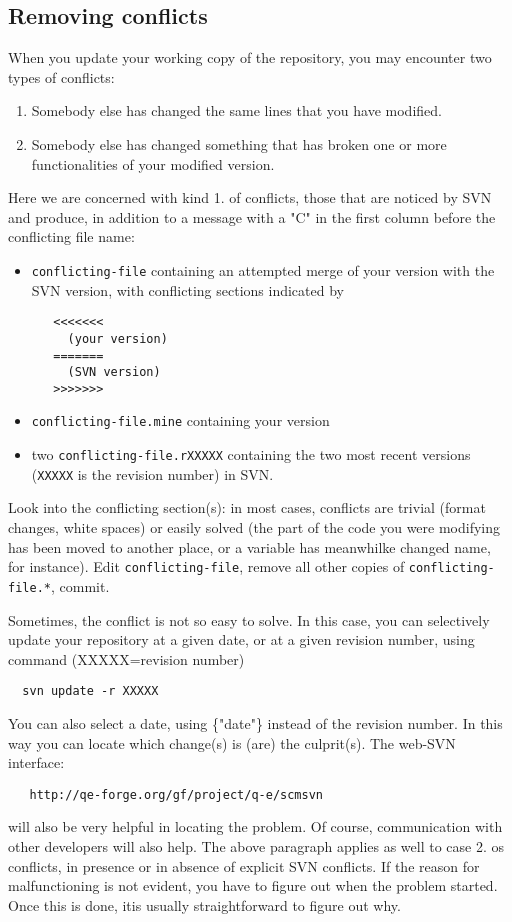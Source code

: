 \documentclass[12pt,a4paper]{article}
\begin{document}
\subsection{Removing conflicts}
\label{SubSec:Conflicts}
When you update your working copy of the repository,
you may encounter two types of conflicts:
\begin{enumerate}
\item Somebody else has changed the same lines that you have
      modified.
\item Somebody else has changed something that has broken one
      or more functionalities of your modified version.
\end{enumerate}
Here we are concerned with kind 1. of conflicts, those that
are noticed by SVN and produce, in addition to a message with
a "C" in the first column before the conflicting file name:
\begin{itemize}
\item \texttt{conflicting-file} containing an attempted merge
of your version with the SVN version, with conflicting sections
indicated by
\begin{verbatim}
   <<<<<<<
     (your version)
   =======
     (SVN version)
   >>>>>>>
\end{verbatim}
\item \texttt{conflicting-file.mine} containing your version
\item two \texttt{conflicting-file.rXXXXX} containing the two most
recent versions (\texttt{XXXXX} is the revision number) in SVN.
\end{itemize}
Look into the conflicting section(s): in most cases, conflicts are trivial
(format changes, white spaces) or easily solved (the part of the code you
were modifying has been moved to another place, or a variable has meanwhilke
changed name, for instance). Edit \texttt{conflicting-file}, remove all other
copies of \texttt{conflicting-file.*}, commit.

Sometimes, the conflict is not so easy to solve. In this case, you
can selectively update your repository at a given date, or at a given
revision number, using command (XXXXX=revision number)
\begin{verbatim}
  svn update -r XXXXX
\end{verbatim}
You can also select a date, using \{"date"\} instead of the revision number.
In this way you can locate which change(s) is (are) the culprit(s).
The web-SVN interface:
\begin{verbatim}
   http://qe-forge.org/gf/project/q-e/scmsvn
\end{verbatim}
will also be very helpful in locating the problem.
Of course, communication with other developers will also help.
The above paragraph applies as well to case 2. os conflicts, in
presence or in absence of explicit SVN conflicts. If the reason for
malfunctioning is not evident, you have to figure out when the
problem started. Once this is done, itis usually straightforward
to figure out why.
\end{document}
